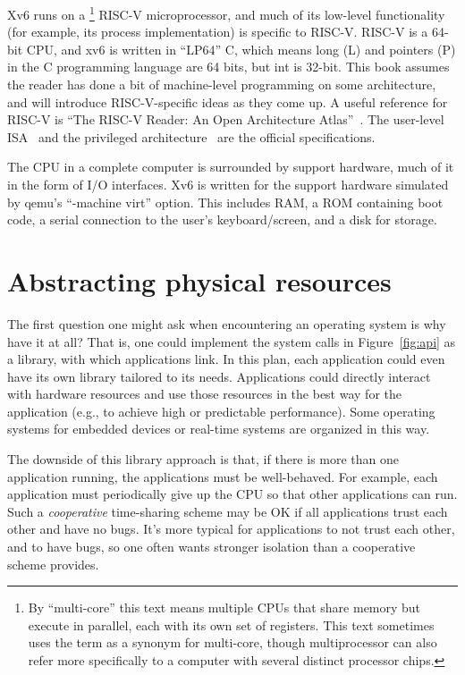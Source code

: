 Xv6 runs on a \footnote{
By ``multi-core'' this text means multiple CPUs that share memory but execute
in parallel, each with its own set of registers.
This text sometimes uses the term
 as a synonym for multi-core,
though multiprocessor can also refer more specifically to a computer with
several distinct processor chips.} RISC-V microprocessor,
and much of its low-level
functionality (for example, its process implementation) is specific to
RISC-V.  RISC-V is a 64-bit CPU, and xv6 is written in ``LP64'' C,
which means long (L) and pointers (P) in the C programming language
are 64 bits, but int is 32-bit.  This book assumes the reader has done
a bit of machine-level programming on some architecture, and will
introduce RISC-V-specific ideas as they come up.  A useful reference
for RISC-V is ``The RISC-V Reader: An Open Architecture
Atlas''~\cite{riscv}.
The user-level ISA~\cite{riscv:user} and the privileged
architecture~\cite{riscv:priv} are the official
specifications.

The CPU in a complete computer is surrounded by support hardware, much
of it in the form of I/O interfaces. Xv6 is written for the support
hardware simulated by qemu's ``-machine virt'' option. This includes
RAM, a ROM containing boot code, a serial connection to the user's
keyboard/screen, and a disk for storage.

\section{Abstracting physical resources}

The first question one might ask when encountering an operating system is why
have it at all?  That is, one could implement the system calls in
Figure~\ref{fig:api}
as a library, with which applications link.  In this plan,
each application could even have its own library tailored to its needs.
Applications could directly interact with hardware resources
and use those resources in the best way for the application (e.g., to achieve
high or predictable performance).  Some operating systems for
embedded devices or real-time systems are organized in this way.

The downside of this library approach is that, if there is more than one
application running, the applications must be well-behaved.
For example, each application must periodically give up the
CPU so that other applications can run.
Such a 
\textit{cooperative} 
time-sharing scheme may be OK if all applications trust each
other and have no bugs. It's more typical for applications
to not trust each other, and to have bugs, so one often wants
stronger isolation than a cooperative scheme provides.


